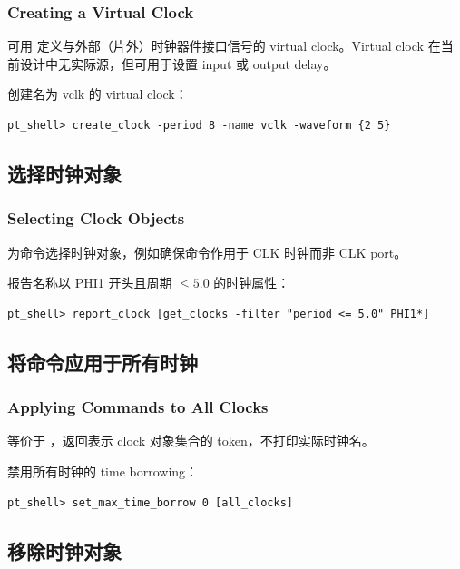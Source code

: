 \subsubsection*{Creating a Virtual Clock}

可用  定义与外部（片外）时钟器件接口信号的 virtual clock。Virtual clock 在当前设计中无实际源，但可用于设置 input 或 output delay。

创建名为 vclk 的 virtual clock：
\begin{lstlisting}
pt_shell> create_clock -period 8 -name vclk -waveform {2 5}
\end{lstlisting}


\subsection{选择时钟对象}
\subsubsection*{Selecting Clock Objects}

 为命令选择时钟对象，例如确保命令作用于 CLK 时钟而非 CLK port。

报告名称以 PHI1 开头且周期 $\leq 5.0$ 的时钟属性：
\begin{lstlisting}
pt_shell> report_clock [get_clocks -filter "period <= 5.0" PHI1*]
\end{lstlisting}

\subsection{将命令应用于所有时钟}
\subsubsection*{Applying Commands to All Clocks}

 等价于 ，返回表示 clock 对象集合的 token，不打印实际时钟名。

禁用所有时钟的 time borrowing：
\begin{lstlisting}
pt_shell> set_max_time_borrow 0 [all_clocks]
\end{lstlisting}

\subsection{移除时钟对象}
